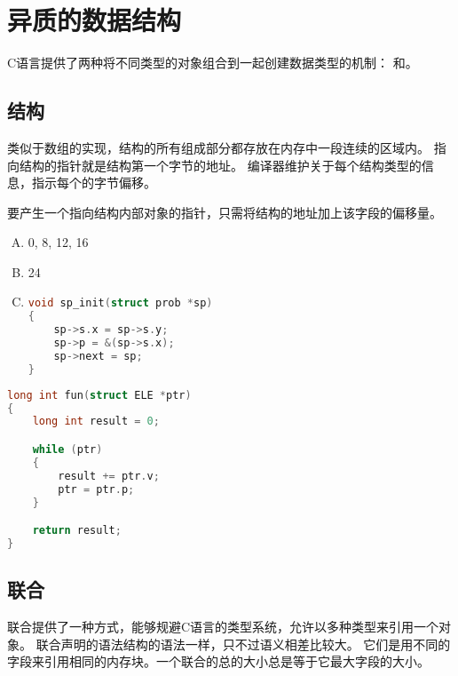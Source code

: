 
\section{异质的数据结构}
{
    C语言提供了两种将不同类型的对象组合到一起创建数据类型的机制：
    和。

    \subsection{结构}
    {
        类似于数组的实现，结构的所有组成部分都存放在内存中一段连续的区域内。
        指向结构的指针就是结构第一个字节的地址。
        编译器维护关于每个结构类型的信息，指示每个的字节偏移。

        要产生一个指向结构内部对象的指针，只需将结构的地址加上该字段的偏移量。

        \begin{practicec}
            \begin{enumerate}[A.]
                \item 0, 8, 12, 16
                \item 24
                \item
                {
                    \begin{lstlisting}[language=C]
void sp_init(struct prob *sp)
{
    sp->s.x = sp->s.y;
    sp->p = &(sp->s.x);
    sp->next = sp;
}
                    \end{lstlisting}
                }
            \end{enumerate}
        \end{practicec}

        \begin{practicec}
            \begin{lstlisting}[language=C]
long int fun(struct ELE *ptr)
{
    long int result = 0;

    while (ptr)
    {
        result += ptr.v;
        ptr = ptr.p;
    }

    return result;
}
            \end{lstlisting}
        \end{practicec}
    }

    \subsection{联合}
    {
        联合提供了一种方式，能够规避C语言的类型系统，允许以多种类型来引用一个对象。
        联合声明的语法结构的语法一样，只不过语义相差比较大。
        它们是用不同的字段来引用相同的内存块。一个联合的总的大小总是等于它最大字段的大小。

}}
